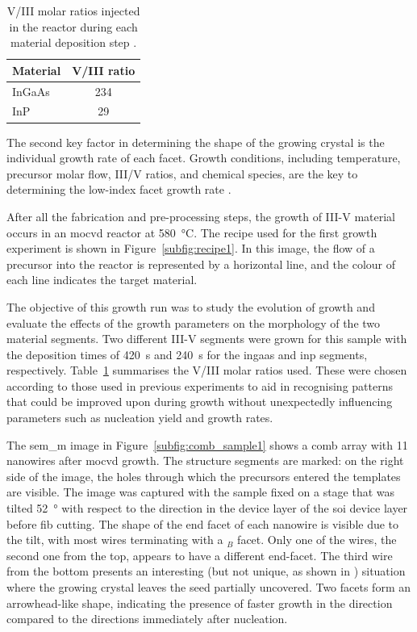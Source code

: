 \begin{table}
    \centering
    \caption[V/III molar ratios injected in the reactor during each material deposition step.]{V/III molar ratios injected in the reactor during each material deposition step \cite{Brugnolotto2023_2}.}
    \begin{tabular}{l|c}
        Material & V/III ratio \\ \hline \hline
        InGaAs  & 234\\
        InP     & 29\\ \hline
    \end{tabular}
    \label{tab:sample1_ratios}
\end{table}

The second key factor in determining the shape of the growing crystal is the individual growth rate of each facet. Growth conditions, including temperature, precursor molar flow, III/V ratios, and chemical species, are the key to determining the low-index facet growth rate \cite{Borg2015, Elsner1992}.
\par
After all the fabrication and pre-processing steps, the growth of III-V material occurs in an \acf{mocvd} reactor at \qty{580}{\degreeCelsius}. The recipe used for the first growth experiment is shown in Figure~\ref{subfig:recipe1}. In this image, the flow of a precursor into the reactor is represented by a horizontal line, and the colour of each line indicates the target material.

The objective of this growth run was to study the evolution of growth and evaluate the effects of the growth parameters on the morphology of the two material segments. Two different III-V segments were grown for this sample with the deposition times of \qty{420}{\second} and \qty{240}{\second} for the \acs{ingaas} and \acs{inp} segments, respectively. Table~\ref{tab:sample1_ratios} summarises the V/III molar ratios used. These were chosen according to those used in previous experiments to aid in recognising patterns that could be improved upon during growth without unexpectedly influencing parameters such as nucleation yield and growth rates.

The \acs{sem_m} image in Figure~\ref{subfig:comb_sample1} shows a comb array with \num{11} nanowires after \acs{mocvd} growth. The structure segments are marked: on the right side of the image, the holes through which the precursors entered the templates are visible. The image was captured with the sample fixed on a stage that was tilted \qty{52}{\degree} with respect to the  direction in the device layer of the \acs{soi} device layer before \acs{fib} cutting. The shape of the end facet of each nanowire is visible due to the tilt, with most wires terminating with a \(_B\) facet. Only one of the wires, the second one from the top, appears to have a different end-facet. The third wire from the bottom presents an interesting (but not unique, as shown in \cite{Scherrer2022}) situation where the growing crystal leaves the seed partially uncovered. Two  facets form an arrowhead-like shape, indicating the presence of faster growth in the  direction compared to the  directions immediately after nucleation.


